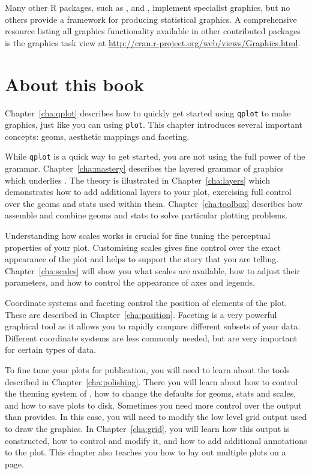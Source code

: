 Many other R packages, such as  \citep{meyer:2006},  \citep{plotrix} and  \citep{gplots}, implement specialist graphics, but no others provide a framework for producing statistical graphics.  A comprehensive resource listing all graphics functionality available in other contributed packages is the graphics task view at \url{http://cran.r-project.org/web/views/Graphics.html}.  

\section{About this book}

Chapter~\ref{cha:qplot} describes how to quickly get started using {\tt qplot} to make graphics, just like you can using {\tt plot}.  This chapter introduces several important \ggplot concepts: geoms, aesthetic mappings and faceting.
  
While {\tt qplot} is a quick way to get started, you are not using the full power of the grammar.  Chapter~\ref{cha:mastery} describes the layered grammar of graphics which underlies \ggplot.  The theory is illustrated in Chapter~\ref{cha:layers} which demonstrates how to add additional layers to your plot, exercising full control over the geoms and stats used within them.  Chapter~\ref{cha:toolbox} describes how assemble and combine geoms and stats \ggplot to solve particular plotting problems.

Understanding how scales works is crucial for fine tuning the perceptual properties of your plot.  Customising scales gives fine control over the exact appearance of the plot and helps to support the story that you are telling.  Chapter~\ref{cha:scales} will show you what scales are available, how to adjust their parameters, and how to control the appearance of axes and legends.

Coordinate systems and faceting control the position of elements of the plot.  These are described in Chapter~\ref{cha:position}.  Faceting is a very powerful graphical tool as it allows you to rapidly compare different subsets of your data.  Different coordinate systems are less commonly needed, but are very important for certain types of data.

To fine tune your plots for publication, you will need to learn about the tools described in Chapter~\ref{cha:polishing}.  There you will learn about how to control the theming system of \ggplot, how to change the defaults for geoms, stats and scales, and how to save plots to disk.  Sometimes you need more control over the output than \ggplot provides.  In this case, you will need to modify the low level grid output used to draw the graphics.  In Chapter~\ref{cha:grid}, you will learn how this output is constructed, how to control and modify it, and how to add additional annotations to the plot.  This chapter also teaches you how to lay out multiple plots on a page.

